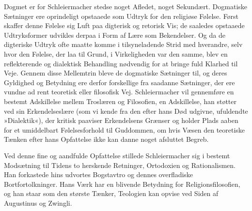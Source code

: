 \documentclass[12pt,a4paper,openany]{book}
\newcommand{\opage}[1]{\marginnote{\footnotesize\textit{[#1]}}}
\begin{document}
Dogmet er for Schleiermacher stedse noget Afledet,
noget Sekundært. Dogmatiske Sætninger ere oprindeligt
opstaaede som Udtryk for den religiøse Følelse. Først
skaffer denne Følelse sig Luft paa digterisk og retorisk
Vis; de saaledes opstaaede Udtryksformer udvikles derpaa
i Form af Lære som Bekendelser. Og da de digteriske
Udtryk ofte maatte komme i tilsyneladende Strid
med hverandre, selv hvor den Følelse, der laa til Grund,
i Virkeligheden var den samme, blev en reflekterende og
dialektisk Behandling nødvendig for at bringe fuld Klarhed
til Veje. Gennem disse Mellemtrin bleve de dogmatiske
Sætninger til, og deres Gyldighed og Betydning
ere derfor forskellige fra saadanne Sætninger, der ere
vundne ad rent teoretisk eller filosofisk Vej. Schleiermacher
vil gennemføre en bestemt Adskillelse mellem
Troslæren og Filosofien, en Adskillelse, han støtter ved
sin Erkendelseslære (som vi kende fra den efter hans
Død udgivne, ufuldendte »Dialektik«), der kritisk paaviser
Erkendelsens Grænser og holder Plads aaben for et
umiddelbart Følelsesforhold til Guddommen, om hvis
\opage{8}Væsen den teoretiske Tænken efter hans Opfattelse ikke
kan danne noget afsluttet Begreb.

Ved denne fine og aandfulde Opfattelse stillede
Schleiermacher sig i bestemt Modsætning til Tidens to
herskende Retninger, Ortodoxien og Rationalismen. Han
forkastede hins udvortes Bogstavtro og dennes overfladiske
Bortfortolkninger. Hans Værk har en blivende
Betydning for Religionsfilosofien, og han staar som den
største Tænker, Teologien kan opvise ved Siden af
Augustinus og Zwingli.
\end{document}
